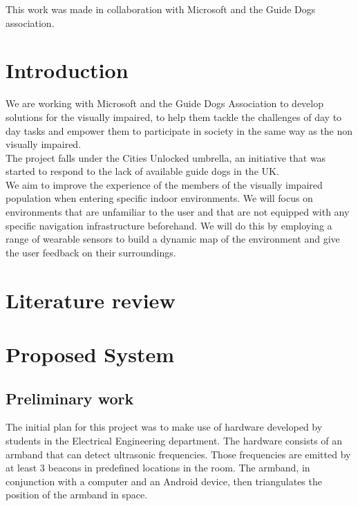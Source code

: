 \documentclass[prodmode,acmtecs]{acmsmall} %
\begin{document}


\begin{bottomstuff}
This work was made in collaboration with Microsoft and the Guide Dogs association.
\end{bottomstuff}

\maketitle

\section{Introduction}
We are working with Microsoft and the Guide Dogs Association to develop solutions for the visually impaired, to help them tackle the challenges of day to day tasks and empower them to participate in society in the same way as the non visually impaired.\\
The project falls under the Cities Unlocked 
umbrella, an initiative that was started to respond to the lack of available guide dogs in the UK.\\
We aim to improve the experience of the members of the visually impaired population when entering specific indoor environments.
We will focus on environments that are unfamiliar to the user and that are not equipped with any specific navigation infrastructure beforehand.
We will do this by employing a range of wearable  sensors to build a dynamic map of the environment and give the user feedback on their surroundings.

\section{Literature review}

\section{Proposed System}
\subsection{Preliminary work}
The initial plan for this project was to make use of hardware developed by students in the Electrical Engineering department. The hardware consists of an armband that can detect ultrasonic frequencies. Those frequencies are emitted by at least 3 beacons in predefined locations in the room. The armband, in conjunction with a computer and an Android device, then triangulates the position of the armband in space.
\end{document}
